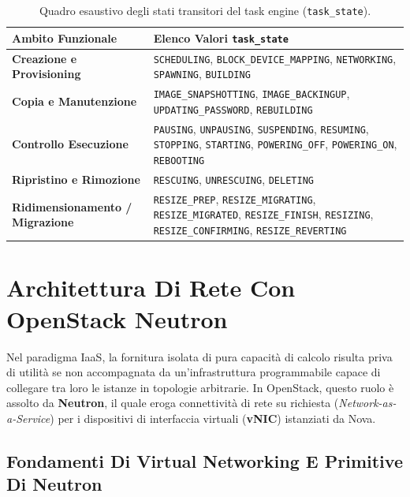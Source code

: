\documentclass[11pt, a4paper]{article}
\begin{document}
\begin{table}[H]
    \centering
    \begin{tabularx}{\textwidth}{p{4.5cm}X}
        \toprule
        \textbf{Ambito Funzionale} & \textbf{Elenco Valori \texttt{task\_state}} \\
        \midrule
        \textbf{Creazione e Provisioning} & \texttt{SCHEDULING}, \texttt{BLOCK\_DEVICE\_MAPPING}, \texttt{NETWORKING}, \texttt{SPAWNING}, \texttt{BUILDING} \\
        \addlinespace
        \textbf{Copia e Manutenzione} & \texttt{IMAGE\_SNAPSHOTTING}, \texttt{IMAGE\_BACKINGUP}, \texttt{UPDATING\_PASSWORD}, \texttt{REBUILDING} \\
        \addlinespace
        \textbf{Controllo Esecuzione} & \texttt{PAUSING}, \texttt{UNPAUSING}, \texttt{SUSPENDING}, \texttt{RESUMING}, \texttt{STOPPING}, \texttt{STARTING}, \texttt{POWERING\_OFF}, \texttt{POWERING\_ON}, \texttt{REBOOTING} \\
        \addlinespace
        \textbf{Ripristino e Rimozione} & \texttt{RESCUING}, \texttt{UNRESCUING}, \texttt{DELETING} \\
        \addlinespace
        \textbf{Ridimensionamento / Migrazione} & \texttt{RESIZE\_PREP}, \texttt{RESIZE\_MIGRATING}, \texttt{RESIZE\_MIGRATED}, \texttt{RESIZE\_FINISH}, \texttt{RESIZING}, \texttt{RESIZE\_CONFIRMING}, \texttt{RESIZE\_REVERTING} \\
        \bottomrule
    \end{tabularx}
    \caption{Quadro esaustivo degli stati transitori del task engine (\texttt{task\_state}).}
\end{table}

\newpage

\section{Architettura Di Rete Con OpenStack Neutron}

Nel paradigma IaaS, la fornitura isolata di pura capacità di calcolo risulta priva di utilità se non accompagnata da un'infrastruttura programmabile capace di collegare tra loro le istanze in topologie arbitrarie. In OpenStack, questo ruolo è assolto da \textbf{Neutron}, il quale eroga connettività di rete su richiesta (\emph{Network-as-a-Service}) per i dispositivi di interfaccia virtuali (\textbf{vNIC}) istanziati da Nova.

\subsection{Fondamenti Di Virtual Networking E Primitive Di Neutron}
\end{document}
